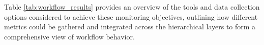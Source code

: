 Table \ref{tab:workflow_results} provides an overview of the tools and data collection options considered to achieve these monitoring objectives, outlining how different metrics could be gathered and integrated across the hierarchical layers to form a comprehensive view of workflow behavior.

\begin{table}[H]
    \centering
    \renewcommand{\arraystretch}{1.15}
\end{table}
